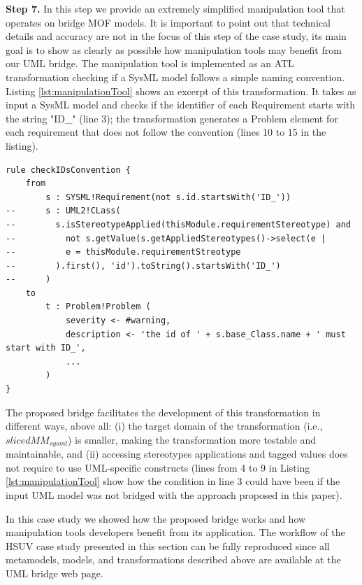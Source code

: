 \textbf{Step 7.} In this step we provide an extremely simplified manipulation tool that operates on bridge MOF models. 
It is important to point out that technical details and accuracy are not in the focus of this step of the case study, 
its main goal is to show as clearly as possible how manipulation tools may benefit from our UML bridge. 
The manipulation tool is implemented as an ATL transformation checking if a SysML model follows a simple naming convention.
Listing \ref{lst:manipulationTool} shows an excerpt of this transformation.
It takes as input a SysML model and checks if the identifier of each Requirement starts with the string "ID\_" (line 3);
the transformation generates a Problem element for each requirement that does not follow the convention (lines 10 to 15 in the listing).
%
\begin{lstlisting}[breaklines,style=AMMA,language=ATL,mathescape,rulesepcolor=\color{black},caption=ATL transformation manipulating SysML models,captionpos=b,label={lst:manipulationTool}]
rule checkIDsConvention {
	from
		s : SYSML!Requirement(not s.id.startsWith('ID_'))
--		s : UML2!CLass(
--		  s.isStereotypeApplied(thisModule.requirementStereotype) and 
--			not s.getValue(s.getAppliedStereotypes()->select(e |
--			e = thisModule.requirementStreotype
--		  ).first(), 'id').toString().startsWith('ID_')
--		)		
	to
		t : Problem!Problem (
			severity <- #warning,
			description <- 'the id of ' + s.base_Class.name + ' must start with ID_',
			...
		)
}
\end{lstlisting}

The proposed bridge facilitates
the development of this transformation in different ways, above all: 
(i) the target domain of the transformation (i.e., $slicedMM_{sysml}$) is smaller, 
making the transformation more testable and maintainable, and 
(ii) accessing stereotypes applications and tagged values 
does not require to use UML-specific constructs (lines from 4 to 9 in Listing \ref{lst:manipulationTool} 
show how the condition in line 3 could have been if the input UML model was not bridged with the approach
proposed in this paper).

In this case study we showed how the proposed bridge works and how manipulation tools developers benefit
from its application. 
The workflow of the HSUV case study presented in this section can be fully reproduced
since all metamodels, models, and transformations described above are available at the UML bridge web page.


